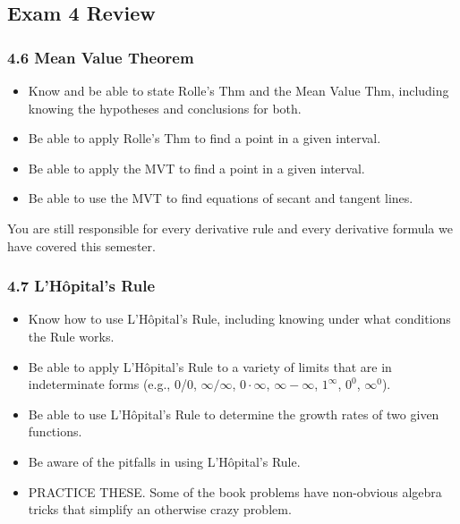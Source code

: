 \documentclass[14pt]{beamer}
\begin{document}
\subsection[Exam 4 Review]{Exam 4 Review}

\begin{frame}
\frametitle{4.6 Mean Value Theorem}
\small
\begin{itemize}
\item Know and be able to state Rolle's Thm and the Mean Value Thm, including knowing the hypotheses and conclusions for both.
\item Be able to apply Rolle's Thm to find a point in a given interval.
\item Be able to apply the MVT to find a point in a given interval.
\item Be able to use the MVT to find equations of secant and tangent lines.
\end{itemize}
\end{frame}

\begin{frame}
\begin{center}
\Large{You are still responsible for every derivative rule and every derivative formula we have covered this semester.}
\end{center}
\end{frame}

\begin{frame}
\frametitle{4.7 L'H\^{o}pital's Rule}
\small
\begin{itemize}
\item Know how to use L'H\^{o}pital's Rule, including knowing under what conditions the Rule works.
\item Be able to apply L'H\^{o}pital's Rule to a variety of limits that are in indeterminate forms (e.g., 0/0, $\infty/\infty$, $0 \cdot \infty$, $\infty-\infty$, $1^{\infty}$, $0^0$, $\infty^0$).
\item Be able to use L'H\^{o}pital's Rule to determine the growth rates of two given functions.
\item Be aware of the pitfalls in using L'H\^{o}pital's Rule.
\item \alert{PRACTICE THESE.}  Some of the book problems have non-obvious algebra tricks that simplify an otherwise crazy problem.
\end{itemize}
\end{frame}
\end{document}
